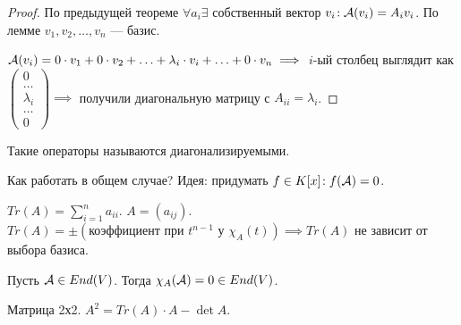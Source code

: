 \begin{proof}
    По предыдущей теореме $\forall a_i \exists $ собственный  вектор  $v_i\!: \mathcal{A}(v_i) = A_iv_i$. По лемме  $v_1, v_2, \ldots, v_n$ --- базис. 

    $\mathcal{A}(v_i) = 0 \cdot v_1 + 0 \cdot v_2 + \ldots + \lambda_i \cdot v_i + \ldots + 0 \cdot v_n \implies$ $i$-ый столбец выглядит как $\begin{pmatrix} 0 \\ \ldots \\ \lambda_i \\ \ldots \\ 0 \end{pmatrix} \implies$ получили диагональную матрицу с $A_{ii} = \lambda_i$.
\end{proof}
\begin{definition}
    Такие операторы называются диагонализируемыми.
\end{definition}
Как работать в общем случае? Идея: придумать $f \in K[x]\!: f(\mathcal{A}) = 0$.

\begin{definition}
    $Tr(A) = \sum\limits_{i=1}^n a_{ii}$.  $A = (a_{ij})$.  $Tr(A) = \pm(\text{коэффициент при }t^{n-1}\text{ у }\chi_{A}(t)) \implies Tr(A)$ не зависит от выбора базиса.
\end{definition}
\begin{theorem}
    Пусть $\mathcal{A} \in End(V)$. Тогда  $\chi_A(\mathcal{A})=0 \in End(V)$. 
    \begin{example}
        Матрица 2х2. $A^2 = Tr(A) \cdot A - \det A$.
    \end{example}
\end{theorem}
